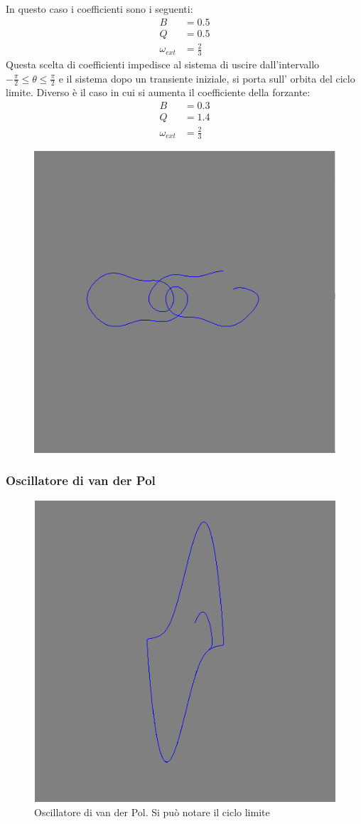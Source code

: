 In questo caso i coefficienti sono i seguenti:
\begin{align*}
B \ & = 0.5\\
Q & = 0.5 \\
\omega_{ext} &= \tfrac{2}{3}
\end{align*}
Questa scelta di coefficienti impedisce al sistema di uscire dall'intervallo $ -\tfrac{\pi}{2} \leq \theta \leq \tfrac{\pi}{2}$ e il sistema dopo un transiente iniziale,
si porta sull' orbita del ciclo limite.
Diverso è il caso in cui si aumenta il coefficiente della forzante:
\begin{align*}
B \ & = 0.3\\
Q & = 1.4 \\
\omega_{ext} &= \tfrac{2}{3}
\end{align*}
\begin{figure}[!h]
\centering
\includegraphics[width=0.7\columnwidth]{sovra1.png}
\end{figure}


\subsubsection{Oscillatore di van der Pol}
\begin{figure}[!h]
  \centering
  \includegraphics[width = 0.6\columnwidth]{van_der_pol.png}
  \caption{Oscillatore di van der Pol. Si può notare il ciclo limite}
\end{figure}

